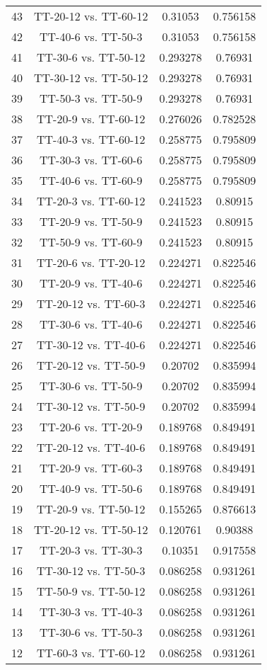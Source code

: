 \documentclass[a4paper,10pt]{article}
\begin{document}
\begin{landscape}
\begin{table}[!htp]
\begin{tabular}{cccc}
43&TT-20-12 vs. TT-60-12&0.31053&0.756158\\
42&TT-40-6 vs. TT-50-3&0.31053&0.756158\\
41&TT-30-6 vs. TT-50-12&0.293278&0.76931\\
40&TT-30-12 vs. TT-50-12&0.293278&0.76931\\
39&TT-50-3 vs. TT-50-9&0.293278&0.76931\\
38&TT-20-9 vs. TT-60-12&0.276026&0.782528\\
37&TT-40-3 vs. TT-60-12&0.258775&0.795809\\
36&TT-30-3 vs. TT-60-6&0.258775&0.795809\\
35&TT-40-6 vs. TT-60-9&0.258775&0.795809\\
34&TT-20-3 vs. TT-60-12&0.241523&0.80915\\
33&TT-20-9 vs. TT-50-9&0.241523&0.80915\\
32&TT-50-9 vs. TT-60-9&0.241523&0.80915\\
31&TT-20-6 vs. TT-20-12&0.224271&0.822546\\
30&TT-20-9 vs. TT-40-6&0.224271&0.822546\\
29&TT-20-12 vs. TT-60-3&0.224271&0.822546\\
28&TT-30-6 vs. TT-40-6&0.224271&0.822546\\
27&TT-30-12 vs. TT-40-6&0.224271&0.822546\\
26&TT-20-12 vs. TT-50-9&0.20702&0.835994\\
25&TT-30-6 vs. TT-50-9&0.20702&0.835994\\
24&TT-30-12 vs. TT-50-9&0.20702&0.835994\\
23&TT-20-6 vs. TT-20-9&0.189768&0.849491\\
22&TT-20-12 vs. TT-40-6&0.189768&0.849491\\
21&TT-20-9 vs. TT-60-3&0.189768&0.849491\\
20&TT-40-9 vs. TT-50-6&0.189768&0.849491\\
19&TT-20-9 vs. TT-50-12&0.155265&0.876613\\
18&TT-20-12 vs. TT-50-12&0.120761&0.90388\\
17&TT-20-3 vs. TT-30-3&0.10351&0.917558\\
16&TT-30-12 vs. TT-50-3&0.086258&0.931261\\
15&TT-50-9 vs. TT-50-12&0.086258&0.931261\\
14&TT-30-3 vs. TT-40-3&0.086258&0.931261\\
13&TT-30-6 vs. TT-50-3&0.086258&0.931261\\
12&TT-60-3 vs. TT-60-12&0.086258&0.931261\\

\end{tabular}
\end{table}
\end{landscape}
\end{document}
